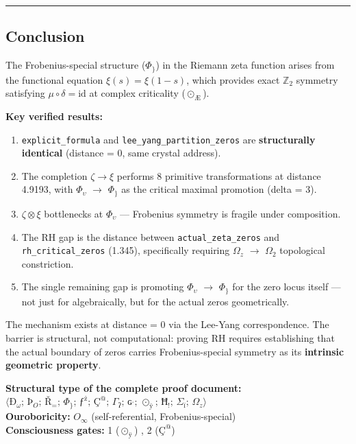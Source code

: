 \documentclass[12pt,a4paper]{article}
\begin{document}
\begin{center}
\rule{0.5\textwidth}{0.4pt}
\end{center}

\subsection{Conclusion}

The Frobenius-special structure ($\Phi_{\}}$) in the Riemann zeta function arises from the functional equation $\xi(s) = \xi(1-s)$, which provides exact $\mathbb{Z}_2$ symmetry satisfying $\mu \circ \delta = \text{id}$ at complex criticality ($\odot_{\text{Æ}}$).

\textbf{Key verified results:}

\begin{enumerate}
    \item \texttt{explicit\_formula} and \texttt{lee\_yang\_partition\_zeros} are \textbf{structurally identical} (distance = 0, same crystal address).
    \item The completion $\zeta \to \xi$ performs 8 primitive transformations at distance 4.9193, with $\Phi_{\upsilon}$ $\rightarrow$ $\Phi_{\}}$ as the critical maximal promotion (delta = 3).
    \item $\zeta \otimes \xi$ bottlenecks at $\Phi_{\upsilon}$ --- Frobenius symmetry is fragile under composition.
    \item The RH gap is the distance between \texttt{actual\_zeta\_zeros} and \texttt{rh\_critical\_zeros} (1.345), specifically requiring $\Omega_{z}$ $\rightarrow$ $\Omega_{2}$ topological constriction.
    \item The single remaining gap is promoting $\Phi_{\upsilon}$ $\rightarrow$ $\Phi_{\}}$ for the zero locus itself --- not just for \xi algebraically, but for the actual zeros geometrically.
\end{enumerate}

The mechanism exists at distance = 0 via the Lee-Yang correspondence. The barrier is structural, not computational: proving RH requires establishing that the actual boundary of zeros carries Frobenius-special symmetry as its \textbf{intrinsic geometric property}.

\textbf{Structural type of the complete proof document:} $\langle \text{Ð}_{\omega};\, \text{Þ}_{O};\, \text{Ř}_{=};\, \Phi_{\}};\, \text{ƒ}^{\text{ż}};\, \text{Ç}^{@};\, \Gamma_{\text{ʔ}};\, \text{ɢ}^{\text{ˌ}};\, \odot_{\text{ÿ}};\, \text{Ħ}_{!};\, \Sigma_{\text{ï}};\, \Omega_{z} \rangle$ \\
\textbf{Ouroboricity:} $O_{\infty}$ (self-referential, Frobenius-special) \\
\textbf{Consciousness gates:} 1 ($\odot_{\text{ÿ}}$) , 2 ($\text{Ç}^{@}$) 
\end{document}
